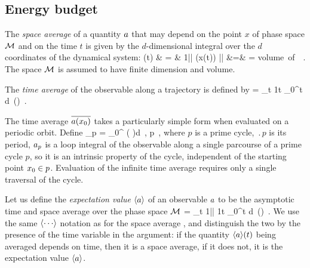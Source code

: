 
\subsection{Energy budget} %
\label{sec:energy}

%
%
The {\em space average} of a quantity $a$ that may depend
on the point $x$ of phase space $\pS$ and on the time $t$ is given
by the $d$-dimensional integral over the $d$ coordinates of the
dynamical system:
\bea
	\!(t) & = & {1\over |\pS|}  \obser(x(t))
   	\continue
	|\pS| &=&  = \mbox{\rm volume of~}\pS
	\,.
	\label{rpo:spac_ave}
\eea
The space $\pS$ is assumed to have finite dimension and volume.

The {\em time average} of the observable
along a trajectory is defined by
\beq
	\timeAver{\obser(\xInit)} 
	= 
	\lim_{t\rightarrow \infty} {1\over t} 
	\int_0^t d\tau \, \obser(\flow{\tau}{\xInit})
	\,.

The time average
$\timeAver{\obser(\xInit)}$ takes a particularly simple form when
evaluated on a periodic orbit. Define
\beq
         \obser_p = 
  \int_0^{ } \obser\left(\flow{\tau}{\xInit} \right)d\tau 
\,,
\hspace{1.0cm}  \xInit \in p
\,,
\label{rpo:Phi_cyc}
\eeq
where $p$ is a prime cycle, $\period{p}$ is its period,
$a_p$ is a loop integral of the observable
along a single parcourse of a prime cycle $p$, so it is an intrinsic
property of the cycle,  independent of the starting point ${x_0} \in p$.
Evaluation of the infinite time average  requires 
only a single traversal of the cycle.

Let us define 
the {\em expectation value}
$\left\langle {a} \right\rangle$ of an observable $a$ to be the asymptotic time
and space average over the phase space $\pS$
\beq
	\expct{\obser}  = 
	\lim_{t\rightarrow \infty} {1\over |\pS|} 
		{1\over t} \int_0^t d\tau \,
		\obser()
	\,.
We use the same $\left\langle {\cdots} \right\rangle$ notation as for
the space average , and distinguish
the two by the presence of the time variable in the argument: if
the quantity $\left\langle {a} \right\rangle\!(t)$ being averaged depends on time, then it is a 
space
average, if it does not, it is the expectation value $\left\langle {a} \right\rangle$.

